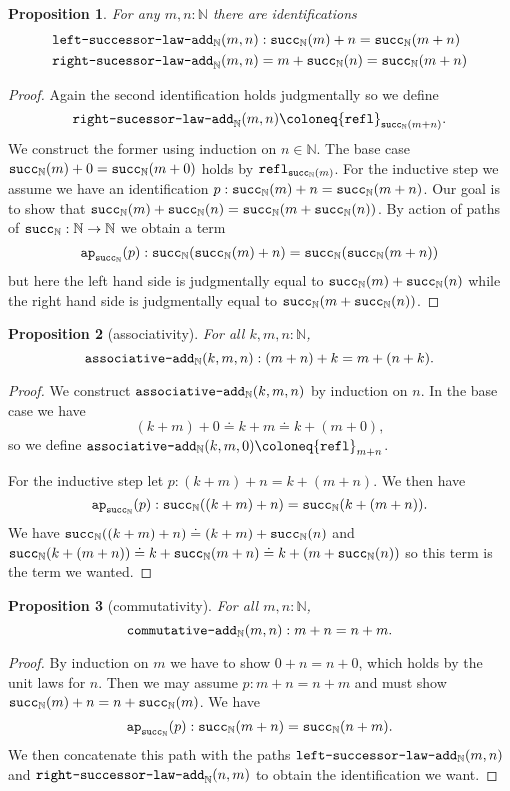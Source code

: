 \documentclass{amsart}
\theoremstyle{theorem}
\newtheorem*{prop}{Proposition}
\theoremstyle{definition}
\theoremstyle{remark}
\newcommand{\0}{\mathbbe{0}}
\newcommand{\1}{\mathbbe{1}}
\newcommand{\2}{\mathbbe{2}}
\newcommand{\3}{\mathbbe{3}}
\newcommand{\4}{\mathbbe{4}}
\newcommand{\term}[1]{{\textup{\texttt{#1}}}}
\newcommand{\bN}{{\mathbb{N}}}
\newcommand{\suc}{\term{succ}_{\bN}}
\newcommand{\refl}{\term{refl}}
\newcommand{\ap}{\term{ap}}
\begin{document}
\begin{prop} For any $m,n : \bN$ there are identifications
\begin{align*} \term{left-successor-law-add}_\bN(m,n) &: \suc(m) + n = \suc(m+n) \\
\term{right-sucessor-law-add}_\bN(m,n) &= m+ \suc(n) = \suc(m+n)
\end{align*}
\end{prop}
\begin{proof}
Again the second identification holds judgmentally so we  define \[\term{right-sucessor-law-add}_\bN(m,n) \coloneq \refl_{\suc(m+n)}.\] We construct the former using induction on $n \in \bN$. The base case $\suc(m)+0 = \suc(m+0)$ holds by $\refl_{\suc(m)}$. For the inductive step we assume we have an identification $p : \suc(m)+n = \suc(m+n)$. Our goal is to show that $\suc(m)+\suc(n) = \suc(m+\suc(n))$. By action of paths of $\suc : \bN \to \bN$ we obtain a term
\[ \ap_{\suc}(p) : \suc(\suc(m)+n) = \suc(\suc(m+n))\] but here the left hand side is judgmentally equal to $\suc(m)+\suc(n)$ while the right hand side is judgmentally equal to $\suc(m+ \suc(n))$.
\end{proof}  

\begin{prop}[associativity] For all $k,m,n : \bN$,
\[ \term{associative-add}_\bN(k,m,n) : (m+n)+k = m+(n+k).\]
\end{prop}
\begin{proof}
We construct $\term{associative-add}_\bN(k,m,n)$ by induction on $n$. In the base case we have
\[ (k+m)+0 \doteq k+m \doteq k + (m+0),\] so we define $\term{associative-add}_\bN(k,m,0) \coloneq \refl_{m+n}$.

For the inductive step let $p : (k+m)+n = k+(m+n)$. We then have
\[ \ap_{\suc}(p) : \suc((k+m)+n) = \suc(k+(m+n)).\]
We have $\suc((k+m)+n) \doteq (k+m)+\suc(n)$ and $\suc(k+(m+n)) \doteq k + \suc(m+n) \doteq k + (m + \suc(n))$ so this term is the term we wanted.
\end{proof}


\begin{prop}[commutativity] For all $m,n : \bN$,
\[ \term{commutative-add}_\bN(m,n) : m+n = n+m.\]
\end{prop}
\begin{proof} By induction on $m$ we have to show $0+n = n+0$, which holds by the unit laws for $n$. Then we may assume $p : m+n = n+m$ and must show $\suc(m)+n= n + \suc(m)$. We have
\[ \ap_{\suc}(p) : \suc(m+n) = \suc(n+m).\] We then concatenate this path with the paths $ \term{left-successor-law-add}_\bN(m,n)$ and $\term{right-successor-law-add}_\bN(n,m)$ to obtain the identification we want. 
\end{proof}
\end{document}
